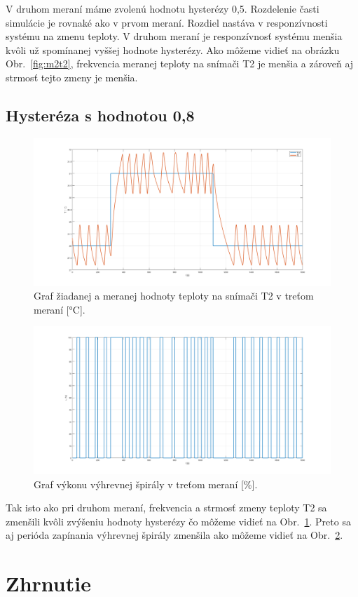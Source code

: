 \documentclass{article}
\begin{document}
V druhom meraní máme zvolenú hodnotu hysterézy 0,5. Rozdelenie časti simulácie je rovnaké ako v prvom meraní.
Rozdiel nastáva v responzívnosti systému na zmenu teploty. V druhom meraní je responzívnosť systému menšia
kvôli už spomínanej vyššej hodnote hysterézy. Ako môžeme vidieť na obrázku Obr.~\ref{fig:m2t2}, frekvencia
meranej teploty na snímači T2 je menšia a zároveň aj strmosť tejto zmeny je menšia.

\subsection{Hysteréza s hodnotou 0,8}
\label{sec:meranie3}

\begin{figure}[!htbp]
	\begin{center}
		\includegraphics[width=\textwidth]{./include/m3T2.png}
	\end{center}
	\caption{Graf žiadanej a meranej hodnoty teploty na snímači T2 v treťom meraní [°C].}
	\label{fig:m3t2}
\end{figure}

\clearpage

\begin{figure}[!htbp]
	\begin{center}
		\includegraphics[width=\textwidth]{./include/m3u.png}
	\end{center}
	\caption{Graf výkonu výhrevnej špirály v treťom meraní [\%].}
	\label{fig:m3u}
\end{figure}

Tak isto ako pri druhom meraní, frekvencia a strmosť zmeny teploty T2 sa zmenšili kvôli zvýšeniu hodnoty hysterézy čo môžeme vidieť na Obr.~\ref{fig:m3t2}. Preto sa aj perióda zapínania výhrevnej špirály zmenšila ako môžeme vidieť na Obr.~\ref{fig:m3u}.

\section{Zhrnutie}
\label{sec:zhrnutie}
\end{document}
